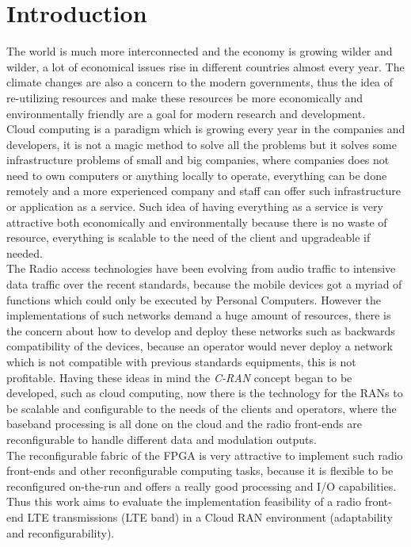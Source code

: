 \chapter{Introduction}
\label{chap:intro}

The world is much more interconnected and the economy is growing wilder and
wilder, a lot of economical issues rise in different countries almost every
year. The climate changes are also a concern to the modern governments, thus the
idea of re-utilizing resources and  make these resources be more economically
and environmentally friendly are a goal for modern research and development.\\

Cloud computing is a paradigm which is growing every year in the companies and
developers, it is not a magic method to solve all the problems but it solves
some infrastructure problems of small and big companies, where companies does
not need to own computers or anything locally to operate, everything can be done
remotely and a more experienced company and staff can offer such infrastructure
or application as a service. Such idea of having everything as a service is very
attractive both economically  and environmentally because there is no waste of
resource, everything is scalable to the need of the client and upgradeable if
needed.\\

The Radio access technologies have been evolving from audio traffic to intensive
data traffic over the recent standards, because the mobile devices got a myriad
of functions which could only be executed by Personal Computers. However the
implementations of such networks demand a huge amount of resources, there is the
concern about how to develop and deploy these networks such as backwards
compatibility of the devices, because an operator would never deploy a network
which is not compatible with previous standards equipments, this is not
profitable. Having these ideas in mind the \textit{C-RAN} concept began to be
developed, such as cloud computing, now there is the technology for the RANs to
be scalable and configurable to the needs of the clients and operators, where
the baseband processing is all done on the cloud and the radio front-ends are
reconfigurable to handle different data and modulation outputs.\\

The reconfigurable fabric of the FPGA is very attractive to implement such radio
front-ends and other reconfigurable computing tasks, because it is flexible to
be reconfigured on-the-run and offers a really good processing and I/O
capabilities. Thus this work aims to evaluate the implementation feasibility of
a radio front-end LTE transmissions (LTE band) in a Cloud RAN environment
(adaptability and reconfigurability).\\

